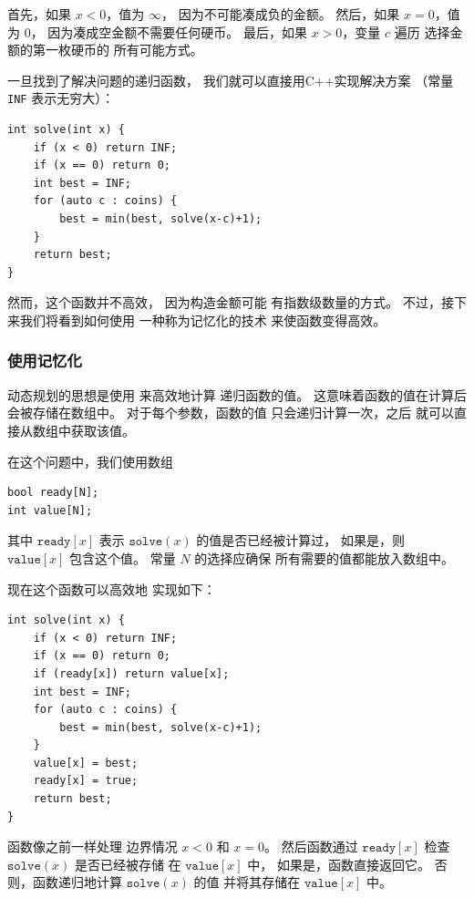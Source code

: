 首先，如果 $x<0$，值为 $\infty$，
因为不可能凑成负的金额。
然后，如果 $x=0$，值为 $0$，
因为凑成空金额不需要任何硬币。
最后，如果 $x>0$，变量 $c$ 遍历
选择金额的第一枚硬币的
所有可能方式。

一旦找到了解决问题的递归函数，
我们就可以直接用C++实现解决方案
（常量 \texttt{INF} 表示无穷大）：

\begin{lstlisting}
int solve(int x) {
    if (x < 0) return INF;
    if (x == 0) return 0;
    int best = INF;
    for (auto c : coins) {
        best = min(best, solve(x-c)+1);
    }
    return best;
}
\end{lstlisting}

然而，这个函数并不高效，
因为构造金额可能
有指数级数量的方式。
不过，接下来我们将看到如何使用
一种称为记忆化的技术
来使函数变得高效。

\subsubsection{使用记忆化}


动态规划的思想是使用
来高效地计算
递归函数的值。
这意味着函数的值在计算后
会被存储在数组中。
对于每个参数，函数的值
只会递归计算一次，之后
就可以直接从数组中获取该值。

在这个问题中，我们使用数组
\begin{lstlisting}
bool ready[N];
int value[N];
\end{lstlisting}

其中 $\texttt{ready}[x]$ 表示
$\texttt{solve}(x)$ 的值是否已经被计算过，
如果是，则 $\texttt{value}[x]$
包含这个值。
常量 $N$ 的选择应确保
所有需要的值都能放入数组中。

现在这个函数可以高效地
实现如下：

\begin{lstlisting}
int solve(int x) {
    if (x < 0) return INF;
    if (x == 0) return 0;
    if (ready[x]) return value[x];
    int best = INF;
    for (auto c : coins) {
        best = min(best, solve(x-c)+1);
    }
    value[x] = best;
    ready[x] = true;
    return best;
}
\end{lstlisting}

函数像之前一样处理
边界情况 $x<0$ 和 $x=0$。
然后函数通过
$\texttt{ready}[x]$ 检查
$\texttt{solve}(x)$ 是否已经被存储
在 $\texttt{value}[x]$ 中，
如果是，函数直接返回它。
否则，函数递归地计算
$\texttt{solve}(x)$ 的值
并将其存储在 $\texttt{value}[x]$ 中。

